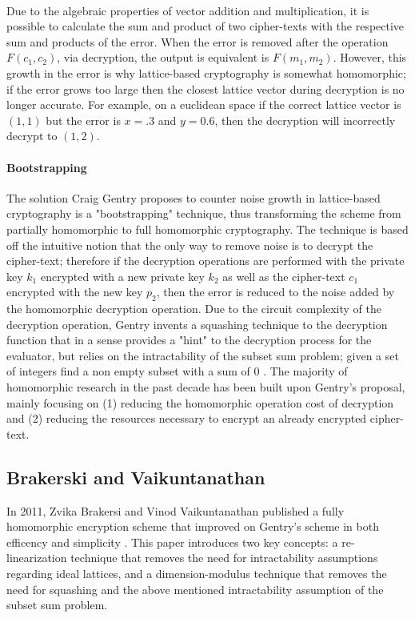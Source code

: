 \documentclass[10pt, a4paper]{article}
\begin{document}
	\paragraph{}
	Due to the algebraic properties of vector addition and multiplication, it is possible to calculate the sum and product of two cipher-texts with the respective sum and products of the error. When the error is removed after the operation $F(c_1,c_2)$, via decryption, the output is equivalent is $F(m_1,m_2)$. However, this growth in the error is why lattice-based cryptography is somewhat homomorphic; if the error grows too large then the closest lattice vector during decryption is no longer accurate. For example, on a euclidean space if the correct lattice vector is $(1,1)$ but the error is $x = .3$ and $y=0.6$, then the decryption will incorrectly decrypt to $(1,2)$.
	
	
	\paragraph{Bootstrapping}
	The solution Craig Gentry proposes to counter noise growth in lattice-based cryptography is a "bootstrapping" technique, thus transforming the scheme from partially homomorphic to full homomorphic cryptography. The technique is based off the intuitive notion that the only way to remove noise is to decrypt the cipher-text; therefore if the decryption operations are performed with the private key $k_1$ encrypted with a new private key $k_2$ as well as the cipher-text $c_1$ encrypted with the new key $p_2$, then the error is reduced to the noise added by the homomorphic decryption operation. Due to the circuit complexity of the decryption operation, Gentry invents a squashing technique to the decryption function that in a sense provides a "hint" to the decryption process for the evaluator, but relies on the intractability of the subset sum problem; given a set of integers find a non empty subset with a sum of 0 \cite{gentry2009fully}. The majority of homomorphic research in the past decade has been built upon Gentry's proposal, mainly focusing on (1) reducing the homomorphic operation cost of decryption and (2) reducing the resources necessary to encrypt an already encrypted cipher-text.

	\subsection{Brakerski and Vaikuntanathan}
	In 2011, Zvika Brakersi and Vinod Vaikuntanathan published a fully homomorphic encryption scheme that improved on Gentry's scheme in both efficency and simplicity \cite{brakerski2014efficient}. This paper introduces two key concepts: a re-linearization technique that removes the need for intractability assumptions regarding ideal lattices, and a dimension-modulus technique that removes the need for squashing and the above mentioned intractability assumption of the subset sum problem. 
\end{document}
